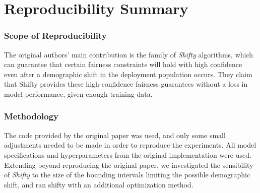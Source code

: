 \section*{\centering Reproducibility Summary}



\subsubsection*{Scope of Reproducibility}


The original authors' \cite{giguere2022} main contribution is the family of \textit{Shifty} algorithms, which can guarantee that certain fairness constraints will hold with high confidence even after a demographic shift in the deployment population occurs. They claim that Shifty provides these high-confidence fairness guarantees without a loss in model performance, given enough training data.

\subsubsection*{Methodology}


The code provided by the original paper was used, and only some small adjustments needed to be made in order to reproduce the experiments. All model specifications and hyperparameters from the original implementation were used. Extending beyond reproducing the original paper, we investigated the sensibility of \textit{Shifty} to the size of the bounding intervals limiting the possible demographic shift, and ran shifty with an additional optimization method.

